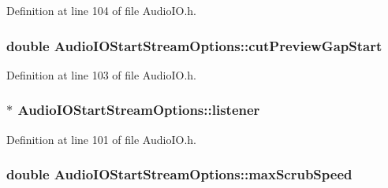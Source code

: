 Definition at line 104 of file Audio\+I\+O.\+h.

\subsubsection[{\texorpdfstring{cut\+Preview\+Gap\+Start}{cutPreviewGapStart}}]{\setlength{\rightskip}{0pt plus 5cm}double Audio\+I\+O\+Start\+Stream\+Options\+::cut\+Preview\+Gap\+Start}\hypertarget{struct_audio_i_o_start_stream_options_ae0b3e06a7234158e7f213302b71df8cb}{}\label{struct_audio_i_o_start_stream_options_ae0b3e06a7234158e7f213302b71df8cb}


Definition at line 103 of file Audio\+I\+O.\+h.

\subsubsection[{\texorpdfstring{listener}{listener}}]{$\ast$ Audio\+I\+O\+Start\+Stream\+Options\+::listener}\hypertarget{struct_audio_i_o_start_stream_options_a326a9c07ece9c6b6ad8be00acc504dac}{}\label{struct_audio_i_o_start_stream_options_a326a9c07ece9c6b6ad8be00acc504dac}


Definition at line 101 of file Audio\+I\+O.\+h.

\subsubsection[{\texorpdfstring{max\+Scrub\+Speed}{maxScrubSpeed}}]{\setlength{\rightskip}{0pt plus 5cm}double Audio\+I\+O\+Start\+Stream\+Options\+::max\+Scrub\+Speed}\hypertarget{struct_audio_i_o_start_stream_options_ac44effeae42cfbcbef718f5737776082}{}\label{struct_audio_i_o_start_stream_options_ac44effeae42cfbcbef718f5737776082}


